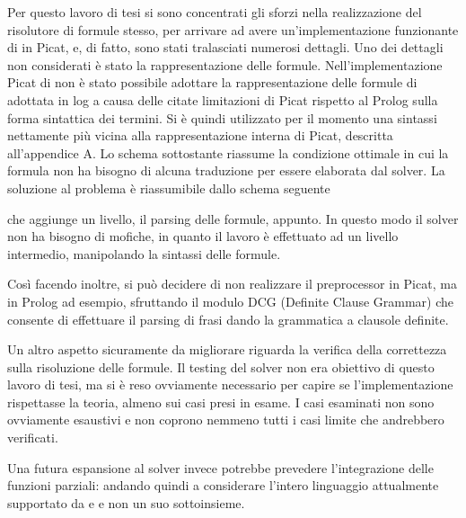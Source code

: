 \documentclass[12pt,a4paper,openright]{book} %
\begin{document}
Per questo lavoro di tesi si sono concentrati gli sforzi nella
realizzazione del risolutore di formule stesso, per arrivare ad avere
un’implementazione funzionante di \lset{} in Picat, e, di fatto, sono
stati tralasciati numerosi dettagli.  Uno dei dettagli non considerati
è stato la rappresentazione delle formule. Nell’implementazione Picat
di \lset{} non è stato possibile adottare la rappresentazione delle
formule di \lset{} adottata in {log} a causa delle citate limitazioni
di Picat rispetto al Prolog sulla forma sintattica dei termini. Si è
quindi utilizzato per il momento una sintassi nettamente più vicina
alla rappresentazione interna di Picat, descritta all’appendice A. Lo
schema sottostante riassume la condizione ottimale in cui la formula
non ha bisogno di alcuna traduzione per essere elaborata dal
solver. La soluzione al problema è riassumibile dallo schema seguente
\begin{figure}[H]
	\centering
\end{figure}
che aggiunge un livello, il parsing delle formule, appunto. In questo
modo il solver non ha bisogno di mofiche, in quanto il lavoro è
effettuato ad un livello intermedio, manipolando la sintassi delle
formule.

Così facendo inoltre, si può decidere di non realizzare il
preprocessor in Picat, ma in Prolog ad esempio, sfruttando il modulo
DCG \cite{MetalevelDCG} (Definite Clause Grammar) che consente di
effettuare il parsing di frasi dando la grammatica a clausole
definite.

Un altro aspetto sicuramente da migliorare riguarda la verifica della
correttezza sulla risoluzione delle formule. Il testing del solver non
era obiettivo di questo lavoro di tesi, ma si è reso ovviamente
necessario per capire se l'implementazione rispettasse la teoria,
almeno sui casi presi in esame. I casi esaminati non sono ovviamente
esaustivi e non coprono nemmeno tutti i casi limite che andrebbero
verificati.

Una futura espansione al solver invece potrebbe prevedere
l'integrazione delle funzioni parziali: andando quindi a considerare
l'intero linguaggio attualmente supportato da \setlog{} e \jsetl{} e
non un suo sottoinsieme.
\end{document}
